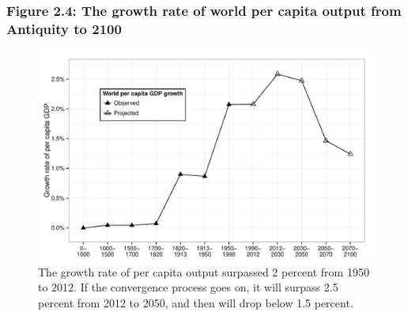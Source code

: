 \documentclass[t]{beamer}\usepackage[]{graphicx}\usepackage[]{color}
\newenvironment{knitrout}{}{} %
\begin{document}
\begin{frame}[label=Figure_2_4]
\frametitle{Figure 2.4: The growth rate of world per capita output from Antiquity to 2100}
\begin{figure}[t]
\begin{minipage}[b]{\textwidth}
\centering
\begin{knitrout}\footnotesize
{}\color{fgcolor}

{\centering \includegraphics[width=1\linewidth]{figures/bw/Figure_2_4} 

}



\end{knitrout}
\caption{The growth rate of per capita output surpassed 2 percent from 1950 to 2012. If the convergence process goes on, it will surpass 2.5 percent from 2012 to 2050, and then will drop below 1.5 percent.}
\end{minipage}
\end{figure}
\end{frame}
\end{document}
